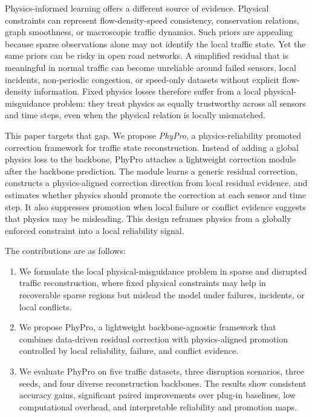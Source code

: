 \documentclass[preprint,12pt]{elsarticle}
\begin{document}
Physics-informed learning offers a different source of evidence. Physical constraints can represent flow-density-speed consistency, conservation relations, graph smoothness, or macroscopic traffic dynamics. Such priors are appealing because sparse observations alone may not identify the local traffic state. Yet the same priors can be risky in open road networks. A simplified residual that is meaningful in normal traffic can become unreliable around failed sensors, local incidents, non-periodic congestion, or speed-only datasets without explicit flow-density information. Fixed physics losses therefore suffer from a local physical-misguidance problem: they treat physics as equally trustworthy across all sensors and time steps, even when the physical relation is locally mismatched.

This paper targets that gap. We propose \emph{PhyPro}, a physics-reliability promoted correction framework for traffic state reconstruction. Instead of adding a global physics loss to the backbone, PhyPro attaches a lightweight correction module after the backbone prediction. The module learns a generic residual correction, constructs a physics-aligned correction direction from local residual evidence, and estimates whether physics should promote the correction at each sensor and time step. It also suppresses promotion when local failure or conflict evidence suggests that physics may be misleading. This design reframes physics from a globally enforced constraint into a local reliability signal.

The contributions are as follows:
\begin{enumerate}
  \item[(1)] We formulate the local physical-misguidance problem in sparse and disrupted traffic reconstruction, where fixed physical constraints may help in recoverable sparse regions but mislead the model under failures, incidents, or local conflicts.
  \item[(2)] We propose PhyPro, a lightweight backbone-agnostic framework that combines data-driven residual correction with physics-aligned promotion controlled by local reliability, failure, and conflict evidence.
  \item[(3)] We evaluate PhyPro on five traffic datasets, three disruption scenarios, three seeds, and four diverse reconstruction backbones. The results show consistent accuracy gains, significant paired improvements over plug-in baselines, low computational overhead, and interpretable reliability and promotion maps.
\end{enumerate}
\end{document}
